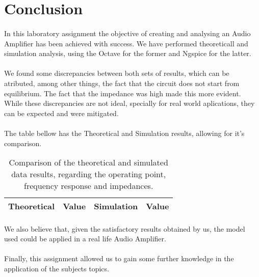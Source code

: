 \section{Conclusion}
\label{sec:conclusion}

\paragraph{} In this laboratory assignment the objective of creating and analysing an Audio Amplifier has been achieved with success. 
We have performed theoreticall and simulation analysis, using the Octave for the former and Ngspice for the latter.

\paragraph{} We found some discrepancies between both sets of results, which can be atributed, among other things, the fact that the circuit 
does not start from equilibrium. The fact that the impedance was high made this more evident. While these discrepancies are not ideal, specially 
for real world aplications, they can be expected and were mitigated.

\paragraph{} The table bellow has the Theoretical and Simulation results, allowing for it's comparison.

\begin{table}[!h]
  \centering
  \begin{tabular}{c c c c}
    \hline    
    {\bf Theoretical} & {\bf Value} & {\bf Simulation} & {\bf Value}\\ \hline
     
  \end{tabular}
  \caption{Comparison of the theoretical and simulated data results, regarding the operating point, frequency response and impedances.}
  \label{tab:comp}
\end{table}

\paragraph{} We also believe that, given the satisfactory results obtained by us, the model used could be applied in a real life Audio Amplifier.

\paragraph{} Finally, this assignment allowed us to gain some further knowledge in the application of the subjects topics.







